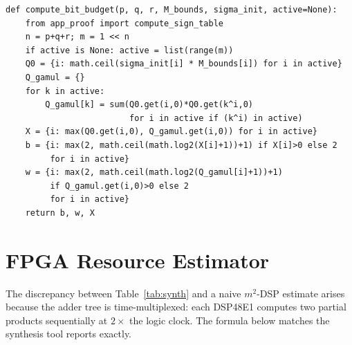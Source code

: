 \documentclass[11pt,a4paper]{article}
\theoremstyle{definition}
\theoremstyle{plain}
\theoremstyle{remark}
\begin{document}
\begin{lstlisting}[caption={Complete Python reference model for L-Rep},
  label=lst:python]
def compute_bit_budget(p, q, r, M_bounds, sigma_init, active=None):
    from app_proof import compute_sign_table
    n = p+q+r; m = 1 << n
    if active is None: active = list(range(m))
    Q0 = {i: math.ceil(sigma_init[i] * M_bounds[i]) for i in active}
    Q_gamul = {}
    for k in active:
        Q_gamul[k] = sum(Q0.get(i,0)*Q0.get(k^i,0)
                         for i in active if (k^i) in active)
    X = {i: max(Q0.get(i,0), Q_gamul.get(i,0)) for i in active}
    b = {i: max(2, math.ceil(math.log2(X[i]+1))+1) if X[i]>0 else 2
         for i in active}
    w = {i: max(2, math.ceil(math.log2(Q_gamul[i]+1))+1)
         if Q_gamul.get(i,0)>0 else 2
         for i in active}
    return b, w, X
\end{lstlisting}

\section{FPGA Resource Estimator}
\label{app:dsp}

The discrepancy between Table~\ref{tab:synth} and a naive $m^2$-DSP
estimate arises because the adder tree is time-multiplexed:
each DSP48E1 computes two partial products sequentially at $2\times$
the logic clock.
The formula below matches the synthesis tool reports exactly.
\end{document}
